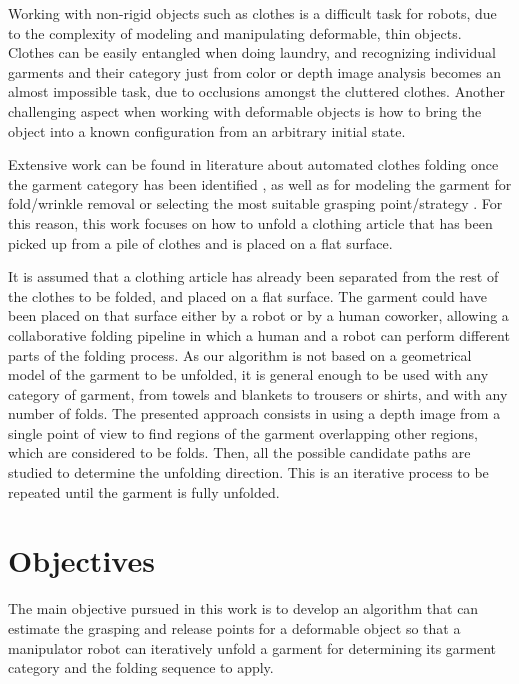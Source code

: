 Working with non-rigid objects such as clothes is a difficult task for robots, due to the complexity of modeling and manipulating deformable, thin objects. Clothes can be easily entangled when doing laundry, and recognizing individual garments and their category just from color or depth image analysis becomes an almost impossible task, due to occlusions amongst the cluttered clothes. Another challenging aspect when working with deformable objects is how to bring the object into a known configuration from an arbitrary initial state.


Extensive work can be found in literature about automated clothes folding once the garment category has been identified  , as well as for modeling the garment for fold/wrinkle removal or selecting the most suitable grasping point/strategy . For this reason, this work focuses on how to unfold a clothing article that has been picked up from a pile of clothes and is placed on a flat surface.

It is assumed that a clothing article has already been separated from the rest of the clothes to be folded, and placed on a flat surface. The garment could have been placed on that surface either by a robot or by a human coworker, allowing a collaborative folding pipeline in which a human and a robot can perform different parts of the folding process.
As our algorithm is not based on a geometrical model of the garment to be unfolded, it is general enough to be used with any category of garment, from towels and blankets to trousers or shirts, and with any number of folds. 
%
The presented approach consists in using a depth image from a single point of view to find regions of the garment overlapping other regions, which are considered to be folds. Then, all the possible candidate paths are studied to determine the unfolding direction. This is an iterative process to be repeated until the garment is fully unfolded.

\section{Objectives}
\label{intro_objectives}
The main objective pursued in this work is to develop an algorithm that can estimate the grasping and release points for a deformable object so that a manipulator robot can iteratively unfold a garment for determining its garment category and the folding sequence to apply.

